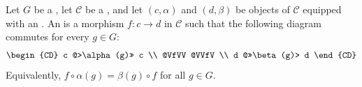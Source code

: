 \begin{definition}
\label{definition:equivariant_morphism_between_objects_with_G_action_in_category_C}
Let $G$ be a , let $\mathcal{C}$ be a , and let $(c, \alpha)$ and $(d, \beta)$ be objects of $\mathcal{C}$ equipped with an . An  is a morphism $f: c \to d$ in $\mathcal{C}$ such that the following diagram commutes for every $g \in G$:
$$\begin{CD}
c @>\alpha(g)>> c \\
@VfVV @VVfV \\
d @>>\beta(g)> d
\end{CD}$$
Equivalently, $f \circ \alpha(g) = \beta(g) \circ f$ for all $g \in G$.
\end{definition}